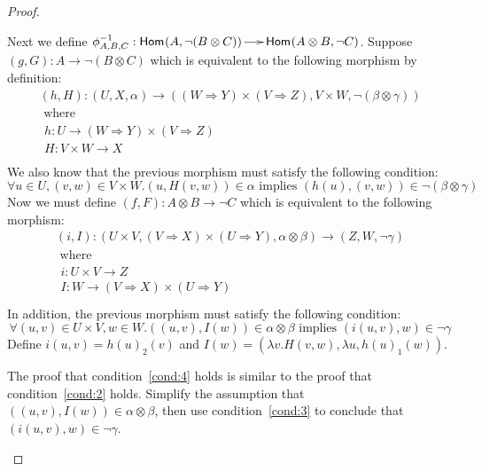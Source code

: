 \begin{proof}
\begin{itemize}
    Next we define $\phi^{-1}_{A,B,C} : \mathsf{Hom}_{\mathcal{}}(A,\lnot (B \otimes
      C)) \to \mathsf{Hom}_{\mathcal{}}(A \otimes B,\lnot C)$. Suppose $(g,G) : A \to
    \lnot (B \otimes C)$ which is equivalent to the following morphism by
    definition:
    \[
    \begin{array}{lll}
      (h,H) : (U,X,\alpha) \to ((W \Rightarrow Y) \times (V \Rightarrow Z), V \times W, \lnot (\beta \otimes \gamma))\\
      \text{ where }\\
      \begin{array}{lll}
        h : U \to (W \Rightarrow Y) \times (V \Rightarrow Z)\\
        H : V \times W \to X\\
      \end{array}
    \end{array}
    \]
    We also know that the previous morphism must satisfy the following
    condition:
    \begin{equation}
      \label{cond:3}
      \forall u \in U,(v,w) \in V \times W.(u,H(v,w)) \in \alpha \text{ implies } (h(u),(v,w)) \in \lnot (\beta \otimes \gamma)
    \end{equation}
    Now we must define $(f,F) : A \otimes B \to \lnot C$ which is
    equivalent to the following morphism:
    \[
    \begin{array}{lll}
      (i,I) : (U \times V, (V \Rightarrow X) \times (U \Rightarrow Y), \alpha \otimes \beta) \to (Z,W,\lnot \gamma)\\
      \text{ where }\\
      \begin{array}{lll}
        i : U \times V \to Z\\
        I : W \to (V \Rightarrow X) \times (U \Rightarrow Y)\\
      \end{array}
    \end{array}
    \]
    In addition, the previous morphism must satisfy the following condition:
    \begin{equation}
      \label{cond:4}
      \forall (u,v) \in U \times V,w \in W.((u,v),I(w)) \in \alpha \otimes \beta \text{ implies } (i(u,v),w) \in \lnot \gamma
    \end{equation}
    Define $i(u,v) = h(u)_2(v)$ and $I(w) = (\lambda v.H(v,w),\lambda u,h(u)_1(w))$.

    The proof that condition~\ref{cond:4} holds is similar to the
    proof that condition~\ref{cond:2} holds.  Simplify the assumption
    that $((u,v),I(w)) \in \alpha \otimes \beta$, then use
    condition~\ref{cond:3} to conclude that $(i(u,v),w) \in \lnot
    \gamma$.


\end{itemize}
\end{proof}
